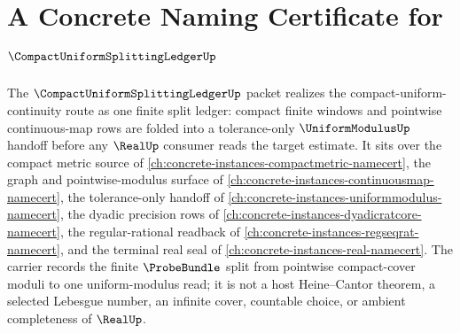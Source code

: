 \chapter{A Concrete Naming Certificate for $\CompactUniformSplittingLedgerUp$}
\label{ch:concrete-instances-compact-uniform-splitting-ledger-namecert}

The $\CompactUniformSplittingLedgerUp$ packet realizes the compact-uniform-continuity route as one finite split ledger: compact finite windows and pointwise continuous-map rows are folded into a tolerance-only $\UniformModulusUp$ handoff before any $\RealUp$ consumer reads the target estimate. It sits over the compact metric source of \autoref{ch:concrete-instances-compactmetric-namecert}, the graph and pointwise-modulus surface of \autoref{ch:concrete-instances-continuousmap-namecert}, the tolerance-only handoff of \autoref{ch:concrete-instances-uniformmodulus-namecert}, the dyadic precision rows of \autoref{ch:concrete-instances-dyadicratcore-namecert}, the regular-rational readback of \autoref{ch:concrete-instances-regseqrat-namecert}, and the terminal real seal of \autoref{ch:concrete-instances-real-namecert}. The carrier records the finite $\ProbeBundle$ split from pointwise compact-cover moduli to one uniform-modulus read; it is not a host Heine--Cantor theorem, a selected Lebesgue number, an infinite cover, countable choice, or ambient completeness of $\RealUp$.

